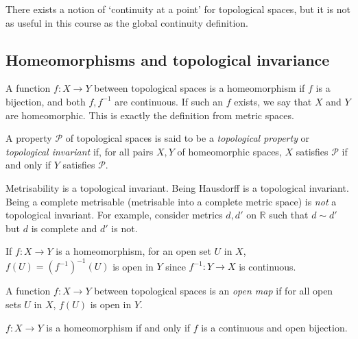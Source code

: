 \begin{remark}
	There exists a notion of `continuity at a point' for topological spaces, but it is not as useful in this course as the global continuity definition.
\end{remark}

\subsection{Homeomorphisms and topological invariance}
\begin{definition}
	A function \( f \colon X \to Y \) between topological spaces is a homeomorphism if \( f \) is a bijection, and both \( f, f^{-1} \) are continuous.
	If such an \( f \) exists, we say that \( X \) and \( Y \) are homeomorphic.
	This is exactly the definition from metric spaces.
\end{definition}
\begin{definition}
	A property \( \mathcal P \) of topological spaces is said to be a \textit{topological property} or \textit{topological invariant} if, for all pairs \( X, Y \) of homeomorphic spaces, \( X \) satisfies \( \mathcal P \) if and only if \( Y \) satisfies \( \mathcal P \).
\end{definition}
\begin{example}
	Metrisability is a topological invariant.
	Being Hausdorff is a topological invariant.
	Being a complete metrisable (metrisable into a complete metric space) is \textit{not} a topological invariant.
	For example, consider metrics \( d, d' \) on \( \mathbb R \) such that \( d \sim d' \) but \( d \) is complete and \( d' \) is not.
\end{example}
\begin{remark}
	If \( f \colon X \to Y \) is a homeomorphism, for an open set \( U \) in \( X \), \( f(U) = (f^{-1})^{-1}(U) \) is open in \( Y \) since \( f^{-1} \colon Y \to X \) is continuous.
\end{remark}
\begin{definition}
	A function \( f \colon X \to Y \) between topological spaces is an \textit{open map} if for all open sets \( U \) in \( X \), \( f(U) \) is open in \( Y \).
\end{definition}
\begin{remark}
	\( f \colon X \to Y \) is a homeomorphism if and only if \( f \) is a continuous and open bijection.
\end{remark}

